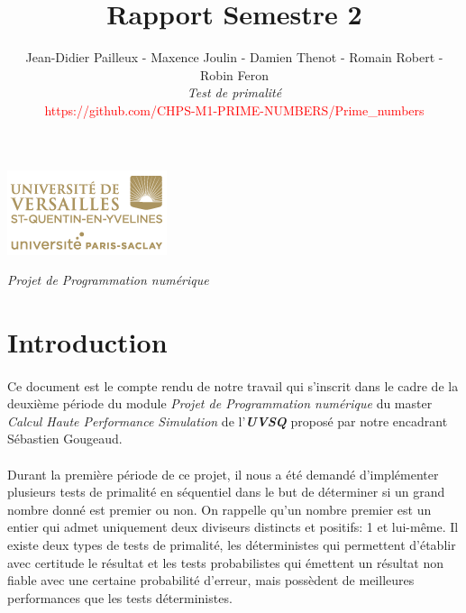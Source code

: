

\title{\vspace{\fill}\textbf{\Huge Rapport Semestre 2}}
\author{Jean-Didier Pailleux - Maxence Joulin - Damien Thenot - Romain Robert - Robin Feron 
	\vspace{2em}\\
	\textit{Test de primalité}\\
	\textcolor{red}{https://github.com/CHPS-M1-PRIME-NUMBERS/Prime\_numbers}
	\vspace{2em}
}
\usepackage{algorithm}
\usepackage{algorithmic}
\usepackage{subcaption}

\clearpage
\maketitle\vspace{13em}
\begin{center}\includegraphics[scale=0.7]{logo.png}\end{center}
\begin{flushright}\textit{Projet de Programmation numérique}\end{flushright}
\newpage
\tableofcontents
\newpage\clearpage{}

	\section{Introduction}
	\paragraph{}Ce document est le compte rendu de notre travail qui s'inscrit dans le cadre de la deuxième période du module \textit{Projet de Programmation numérique} du master \textit{Calcul Haute Performance Simulation} de l'\textit{\textbf{UVSQ}} proposé par notre encadrant Sébastien Gougeaud.
	
	\paragraph{}Durant la première période de ce projet, il nous a été demandé d'implémenter plusieurs tests de primalité en séquentiel dans le but de déterminer si un grand nombre donné est premier ou non. On rappelle qu'un nombre premier est un entier qui admet uniquement deux diviseurs distincts et positifs: 1 et lui-même. Il existe deux types de tests de primalité, les déterministes qui permettent d'établir avec certitude le résultat et les tests probabilistes qui émettent un résultat non fiable avec une certaine probabilité d'erreur, mais possèdent de meilleures performances que les tests déterministes.

